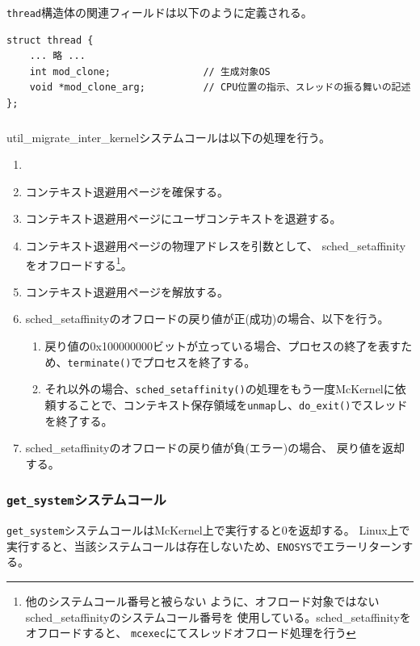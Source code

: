 \documentclass[twoside,11pt,fleqn]{book}
\begin{document}
\texttt{thread}構造体の関連フィールドは以下のように定義される。
\small
\begin{verbatim}
struct thread {
    ... 略 ...
    int mod_clone;                // 生成対象OS
    void *mod_clone_arg;          // CPU位置の指示、スレッドの振る舞いの記述
};
\end{verbatim}
\normalsize

\subsubsection{}
util\_migrate\_inter\_kernelシステムコールは以下の処理を行う。
\begin{enumerate}
\item {}
\item コンテキスト退避用ページを確保する。
\item コンテキスト退避用ページにユーザコンテキストを退避する。
\item コンテキスト退避用ページの物理アドレスを引数として、
sched\_setaffinityをオフロードする\footnote{他のシステムコール番号と被らない
ように、オフロード対象ではないsched\_setaffinityのシステムコール番号を
使用している。sched\_setaffinityをオフロードすると、
\texttt{mcexec}にてスレッドオフロード処理を行う}。
\item コンテキスト退避用ページを解放する。
\item sched\_setaffinityのオフロードの戻り値が正(成功)の場合、以下を行う。
\begin{enumerate}
\item 戻り値の0x100000000ビットが立っている場合、プロセスの終了を表すため、\texttt{terminate()}でプロセスを終了する。
\item それ以外の場合、\texttt{sched\_setaffinity()}の処理をもう一度McKernelに依頼することで、コンテキスト保存領域を\texttt{unmap}し、\texttt{do\_exit()}でスレッドを終了する。
\end{enumerate}
\item sched\_setaffinityのオフロードの戻り値が負(エラー)の場合、
戻り値を返却する。
\end{enumerate}

\subsubsection{\texttt{get\_system}システムコール}
\texttt{get\_system}システムコールはMcKernel上で実行すると0を返却する。
Linux上で実行すると、当該システムコールは存在しないため、\texttt{ENOSYS}でエラーリターンする。
\end{document}
